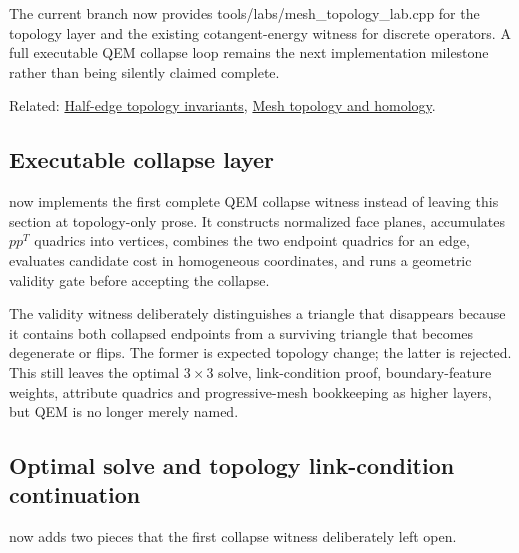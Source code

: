 The current branch now provides tools/labs/mesh\_topology\_lab.cpp for the topology layer and the existing cotangent-energy witness for discrete operators. A full executable QEM collapse loop remains the next implementation milestone rather than being silently claimed complete.

Related: \hyperref[appendix-faac749c9cdd]{Half-edge topology invariants}, \hyperref[appendix-e38976cbbf86]{Mesh topology and homology}.

\subsection{Executable collapse layer}\label{appendix-89db9fe1bc8a-executable-collapse-layer}

\hypertarget{appendix-89db9fe1bc8a-executable-collapse-layer}{}

 now implements the first complete QEM collapse witness instead of leaving this section at topology-only prose. It constructs normalized face planes, accumulates \(pp^T\) quadrics into vertices, combines the two endpoint quadrics for an edge, evaluates candidate cost in homogeneous coordinates, and runs a geometric validity gate before accepting the collapse.

The validity witness deliberately distinguishes a triangle that disappears because it contains both collapsed endpoints from a surviving triangle that becomes degenerate or flips. The former is expected topology change; the latter is rejected. This still leaves the optimal \(3\times3\) solve, link-condition proof, boundary-feature weights, attribute quadrics and progressive-mesh bookkeeping as higher layers, but QEM is no longer merely named.

\subsection{Optimal solve and topology link-condition continuation}\label{appendix-89db9fe1bc8a-optimal-solve-and-topology-link-condition-continuation}

\hypertarget{appendix-89db9fe1bc8a-optimal-solve-and-topology-link-condition-continuation}{}

 now adds two pieces that the first collapse witness deliberately left open.

